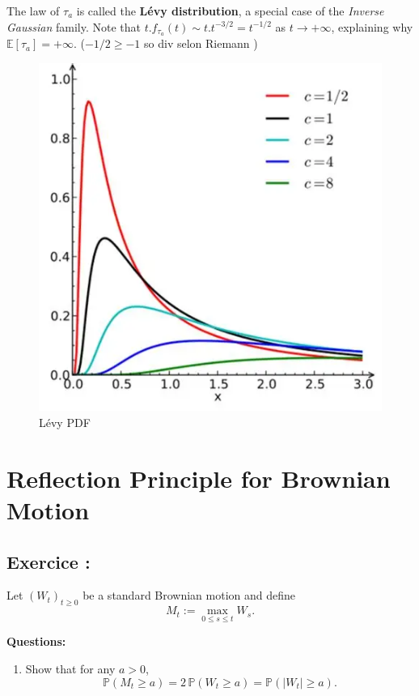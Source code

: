 The law of \( \tau_a \) is called the \textbf{Lévy distribution}, a special case of the \emph{Inverse Gaussian} family.  
Note that \( t.f_{\tau_a}(t) \sim t.t^{-3/2} = t^{-1/2} \) as \( t \to +\infty \), explaining why
\( \mathbb{E}[\tau_a] = +\infty. \) ($-1/2 \ge -1$ so div selon Riemann )


\begin{figure}[h]
    \centering
    \includegraphics[width=0.75\linewidth]{01_math/03_chapter_calcul_stochastique/levy_dis.png}
    \caption{Lévy PDF}
    \label{fig:placeholder}
\end{figure}


\section{Reflection Principle for Brownian Motion}

\subsection*{Exercice :}

\begin{exerciseBox}
Let \( (W_t)_{t \ge 0} \) be a standard Brownian motion and define
\[
M_t := \max_{0 \le s \le t} W_s.
\]

\textbf{Questions:}
\begin{enumerate}
  \item Show that for any \( a > 0 \),
  \[
  \mathbb{P}(M_t \ge a) = 2\,\mathbb{P}(W_t \ge a) = \mathbb{P}(|W_t| \ge a).
  \]
\end{enumerate}
\end{exerciseBox}

